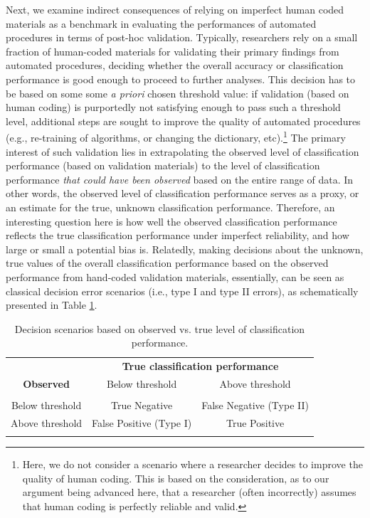 \documentclass[man, floatsintext, 12pt, a4paper, noextraspace]{apa6}
\begin{document}
    Next, we examine indirect consequences of relying on imperfect human coded materials as a benchmark in evaluating the performances of automated procedures in terms of post-hoc validation. Typically, researchers rely on a small fraction of human-coded materials for validating their primary findings from automated procedures, deciding whether the overall accuracy or classification performance is good enough to proceed to further analyses. This decision has to be based on some some \textit{a priori} chosen threshold value: if validation (based on human coding) is purportedly not satisfying enough to pass such a threshold level, additional steps are sought to improve the quality of automated procedures (e.g., re-training of algorithms, or changing the dictionary, etc).\footnote{ Here, we do not consider a scenario where a researcher decides to improve the quality of human coding. This is based on the consideration, as to our argument being advanced here, that a researcher (often incorrectly) assumes that human coding is perfectly reliable and valid.} The primary interest of such validation lies in extrapolating the observed level of classification performance (based on validation materials) to the level of classification performance \textit{that could have been observed} based on the entire range of data. In other words, the observed level of classification performance serves as a proxy, or an estimate for the true, unknown classification performance. Therefore, an interesting question here is how well the observed classification performance reflects the true classification performance under imperfect reliability, and how large or small a potential bias is. Relatedly, making decisions about the unknown, true values of the overall classification performance based on the observed performance from hand-coded validation materials, essentially, can be seen as classical decision error scenarios (i.e., type I and type II errors), as schematically presented in Table \ref{tab:Table2}. \newline

\begin{table}[!htbp] 
 	\begin{minipage}{\textwidth}
    \centering
\caption{Decision scenarios based on observed vs. true level of classification performance.} \label{tab:Table2} 
  \begin{tabular}{ ccc}
\toprule
      \multicolumn{1}{c}{} & \multicolumn{2}{c}{\textbf{True classification performance}} \\
\cline{2-3}
   \textbf{Observed} & Below threshold & Above threshold \\
\hline \\[-1.8ex] 
 Below threshold & True Negative & False Negative (Type II) \\ 
 Above threshold & False Positive (Type I) & True Positive \\ 
\hline \\[-1.8ex]  
  \end{tabular}
  \end{minipage}
\end{table} 
\end{document}
